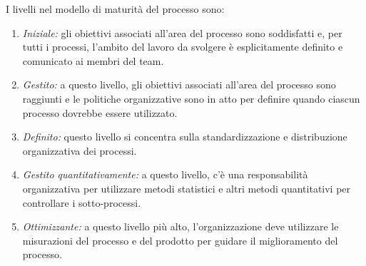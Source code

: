 I livelli nel modello di maturità del processo sono:
\begin{enumerate}
    \item \textit{Iniziale:} gli obiettivi associati all'area del processo sono soddisfatti e, per tutti i processi, l'ambito del lavoro da svolgere è esplicitamente definito e comunicato ai membri del team.
    \item \textit{Gestito:} a questo livello, gli obiettivi associati all'area del processo sono raggiunti e le politiche organizzative sono in atto per definire quando ciascun processo dovrebbe essere utilizzato.
    \item \textit{Definito:} questo livello si concentra sulla standardizzazione e distribuzione organizzativa dei processi.
    \item \textit{Gestito quantitativamente:} a questo livello, c'è una responsabilità organizzativa per utilizzare metodi statistici e altri metodi quantitativi per controllare i sotto-processi.
    \item \textit{Ottimizzante:} a questo livello più alto, l'organizzazione deve utilizzare le misurazioni del processo e del prodotto per guidare il miglioramento del processo.
\end{enumerate}

\newpage
